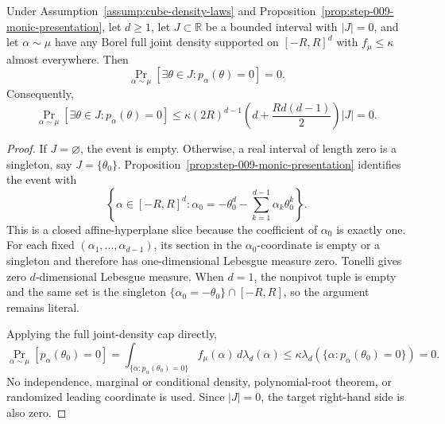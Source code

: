 \begin{lemma}
\label{lem:step-010-degenerate-interval}
Under Assumption~\ref{assump:cube-density-laws} and Proposition~\ref{prop:step-009-monic-presentation}, let \(d\geq1\), let \(J\subset\mathbb R\) be a bounded interval with \(\lvert J\rvert=0\), and let \(\alpha\sim\mu\) have any Borel full joint density supported on \([-R,R]^d\) with \(f_\mu\leq\kappa\) almost everywhere. Then
\begin{equation}
\label{eq:appendix-display-330}
\Pr_{\alpha\sim\mu}[\exists\theta\in J:p_\alpha(\theta)=0]=0.
\end{equation}
Consequently,
\begin{equation}
\label{eq:appendix-display-331}
\Pr_{\alpha\sim\mu}[\exists\theta\in J:p_\alpha(\theta)=0]
\leq
\kappa(2R)^{d-1}
\left(d+\frac{Rd(d-1)}2\right)\lvert J\rvert
=0.
\end{equation}


\end{lemma}

\begin{proof}
If \(J=\varnothing\), the event is empty. Otherwise, a real interval of length zero is a singleton, say \(J=\{\theta_0\}\). Proposition~\ref{prop:step-009-monic-presentation} identifies the event with
\begin{equation}
\label{eq:appendix-display-332}
\left\{\alpha\in[-R,R]^d:
\alpha_0=-\theta_0^d-\sum_{k=1}^{d-1}\alpha_k\theta_0^k\right\}.
\end{equation}
This is a closed affine-hyperplane slice because the coefficient of \(\alpha_0\) is exactly one. For each fixed \((\alpha_1,\ldots,\alpha_{d-1})\), its section in the \(\alpha_0\)-coordinate is empty or a singleton and therefore has one-dimensional Lebesgue measure zero. Tonelli gives zero \(d\)-dimensional Lebesgue measure. When \(d=1\), the nonpivot tuple is empty and the same set is the singleton \(\{\alpha_0=-\theta_0\}\cap[-R,R]\), so the argument remains literal.

Applying the full joint-density cap directly,
\begin{equation}
\label{eq:appendix-display-333}
\Pr_{\alpha\sim\mu}[p_\alpha(\theta_0)=0]
=
\int_{\{\alpha:p_\alpha(\theta_0)=0\}}f_\mu(\alpha)\,d\lambda_d(\alpha)
\leq
\kappa\lambda_d(\{\alpha:p_\alpha(\theta_0)=0\})
=0.
\end{equation}
No independence, marginal or conditional density, polynomial-root theorem, or randomized leading coordinate is used. Since \(\lvert J\rvert=0\), the target right-hand side is also zero. 
\end{proof}

